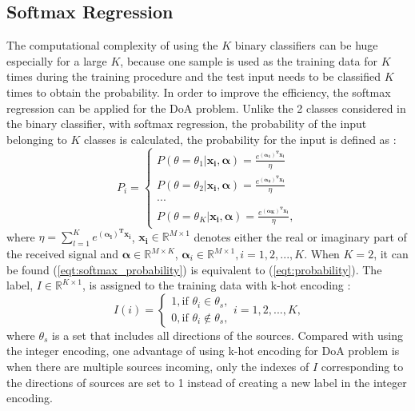 \documentclass[journal]{IEEEtran}
\begin{document}
\subsection{Softmax Regression}
The computational complexity of using the $K$ binary classifiers can be huge especially for a large $K$, because one sample is used as the training data for $K$ times during the training procedure and the test input needs to be classified $K$ times to obtain the probability. 
In order to improve the efficiency, the softmax regression can be applied for the DoA problem. Unlike the 2 classes considered in the binary classifier, with softmax regression, the probability of the input belonging to $K$ classes is calculated, the probability for the input is defined as :
\begin{equation} \label{eqt:softmax_probability}
P_{i} = \left\{\begin{matrix}
P(\theta = \theta_{1} | \boldsymbol{x_{i},\alpha}) = \frac{e^{\boldsymbol{(\alpha_{1})^{T}x_{i}}}}{\eta}\\ 
P(\theta = \theta_{2} | \boldsymbol{x_{i},\alpha}) = \frac{e^{\boldsymbol{(\alpha_{2})^{T}x_{i}}}}{\eta}\\
...\\
P(\theta = \theta_{K} | \boldsymbol{x_{i},\alpha}) = \frac{e^{\boldsymbol{(\alpha_{K})^{T}x_{i}}}}{\eta},
\end{matrix}\right.
\end{equation}   
where $\eta =\sum_{l = 1}^{K} e^{\boldsymbol{(\alpha_{l})^{T}x_{i}}}$, $\boldsymbol{x_{i}}  \in  \mathbb{R}^{M\times 1}$ denotes either the real or imaginary part of the received signal and $\boldsymbol{\alpha} \in  \mathbb{R}^{M \times K}$, $\boldsymbol{\alpha}_{i} \in  \mathbb{R}^{M \times 1}, i = 1,2,...,K$. When $K = 2$, it can be found (\ref{eqt:softmax_probability}) is equivalent to (\ref{eqt:probability}).
The label, $I \in \mathbb{R}^{K \times 1}$,  is assigned to the training data with k-hot encoding : 
\begin{equation} \label{eqt:k_hot_encoding}  
I(i) = \left\{\begin{matrix}
1, \text{if } \theta_{i} \in \theta_{s}, \\ 
0, \text{if } \theta_{i} \notin \theta_{s},
\end{matrix}\right.
i = 1,2,...,K,
\end{equation}
where $\theta_{s}$ is a set that includes all directions of the sources.  
Compared with using the integer encoding, one advantage of using k-hot encoding for DoA problem is when there are multiple sources incoming, only the indexes of $I$ corresponding to the directions of sources are set to 1 instead of creating a new label in the integer encoding.    
\end{document}
